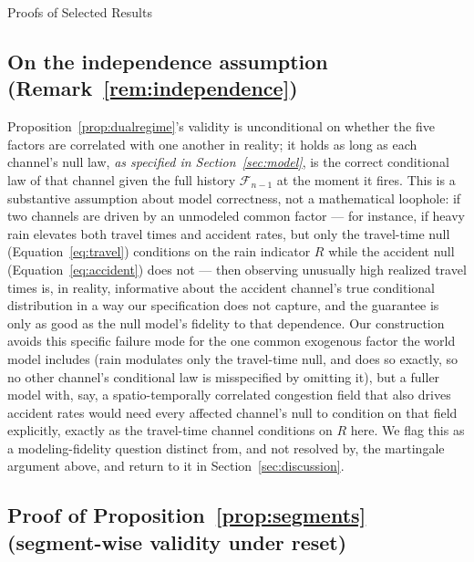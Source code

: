 \documentclass[trsc,dblanonrev]{informs4}
\newcommand{\F}{\mathcal{F}}
\begin{document}
\begin{APPENDIX}{Proofs of Selected Results}
\subsection{On the independence assumption (Remark~\ref{rem:independence})}

Proposition~\ref{prop:dualregime}'s validity is unconditional on
whether the five factors are correlated with one another in reality;
it holds as long as each channel's null law, \emph{as specified in
Section~\ref{sec:model}}, is the correct conditional law of that
channel given the full history $\F_{n-1}$ at the moment it fires. This
is a substantive assumption about model correctness, not a mathematical
loophole: if two channels are driven by an unmodeled common factor ---
for instance, if heavy rain elevates both travel times and accident
rates, but only the travel-time null (Equation~\eqref{eq:travel})
conditions on the rain indicator $R$ while the accident null
(Equation~\eqref{eq:accident}) does not --- then observing unusually
high realized travel times is, in reality, informative about the
accident channel's true conditional distribution in a way our
specification does not capture, and the guarantee is only as good as
the null model's fidelity to that dependence. Our construction avoids
this specific failure mode for the one common exogenous factor the
world model includes (rain modulates only the travel-time null, and
does so exactly, so no other channel's conditional law is
misspecified by omitting it), but a fuller model with, say, a
spatio-temporally correlated congestion field that also drives
accident rates would need every affected channel's null to condition
on that field explicitly, exactly as the travel-time channel
conditions on $R$ here. We flag this as a modeling-fidelity question
distinct from, and not resolved by, the martingale argument above, and
return to it in Section~\ref{sec:discussion}.

\subsection{Proof of Proposition~\ref{prop:segments} (segment-wise validity under reset)}


\end{APPENDIX}
\end{document}
